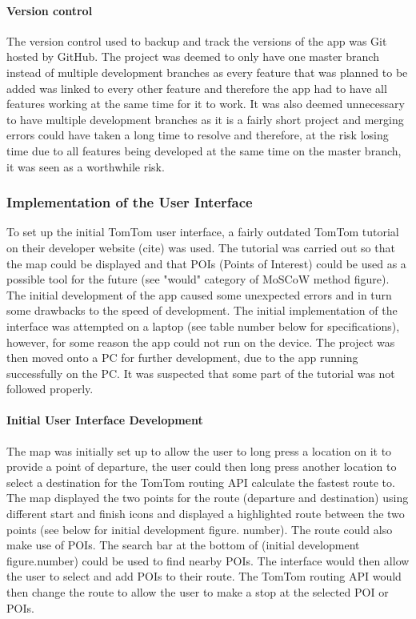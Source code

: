 \documentclass[12pt,a4paper]{article}
\begin{document}
\paragraph{Version control}
The version control used to backup and track the versions of the app was Git hosted by GitHub. The project was deemed to only have one master branch instead of multiple development branches as every feature that was planned to be added was linked to every other feature and therefore the app had to have all features working at the same time for it to work. It was also deemed unnecessary to have multiple development branches as it is a fairly short project and merging errors could have taken a long time to resolve and therefore, at the risk losing time due to all features being developed at the same time on the master branch, it was seen as a worthwhile risk.

\subsubsection{Implementation of the User Interface}
To set up the initial TomTom user interface, a fairly outdated TomTom tutorial on their developer website (cite) was used. The tutorial was carried out so that the map could be displayed and that POIs (Points of Interest) could be used as a possible tool for the future (see "would" category of MoSCoW method figure). The initial development of the app caused some unexpected errors and in turn some drawbacks to the speed of development. The initial implementation of the interface was attempted on a laptop (see table number below for specifications), however, for some reason the app could not run on the device. The project was then moved onto a PC for further development, due to the app running successfully on the PC. It was suspected that some part of the tutorial was not followed properly.

\paragraph{Initial User Interface Development}

 The map was initially set up to allow the user to long press a location on it to provide a point of departure, the user could then long press another location to select a destination for the TomTom routing API calculate the fastest route to. The map displayed the two points for the route (departure and destination) using different start and finish icons and displayed a highlighted route between the two points (see below for initial development figure. number). The route could also make use of POIs. The search bar at the bottom of (initial development figure.number) could be used to find nearby POIs. The interface would then allow the user to select and add POIs to their route. The TomTom routing API would then change the route to allow the user to make a stop at the selected POI or POIs.
\end{document}
